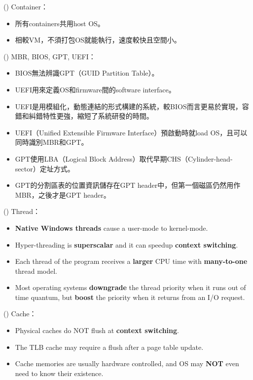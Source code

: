 \begin{theorem}{()} Container： \begin{itemize}
        \item 所有containers共用host OS。
        \item 相較VM，不須打包OS就能執行，速度較快且空間小。
    \end{itemize}
\end{theorem}

\begin{theorem}{()} MBR, BIOS, GPT, UEFI： \begin{itemize}
        \item BIOS無法辨識GPT（GUID Partition Table）。
        \item UEFI用來定義OS和firmware間的software interface。
        \item UEFI是用模組化，動態連結的形式構建的系統，較BIOS而言更易於實現，容錯和糾錯特性更強，縮短了系統研發的時間。
        \item UEFI（Unified Extensible Firmware Interface）預啟動時就load OS，且可以同時識別MBR和GPT。
        \item GPT使用LBA（Logical Block Address）取代早期CHS（Cylinder-head-sector）定址方式。
        \item GPT的分割區表的位置資訊儲存在GPT header中，但第一個磁區仍然用作MBR，之後才是GPT header。
    \end{itemize}
\end{theorem}

\begin{theorem}{()} Thread： \begin{itemize}
        \item \textbf{Native Windows threads} cause a user-mode to kernel-mode.
        \item Hyper-threading is \textbf{superscalar} and it can speedup \textbf{context switching}.
        \item Each thread of the program receives a \textbf{larger} CPU time with \textbf{many-to-one} thread model.
        \item Most operating systems \textbf{downgrade} the thread priority when it runs out of time quantum, but \textbf{boost} the priority when it returns from an I/O request.
    \end{itemize}
\end{theorem}

\begin{theorem}{()} Cache： \begin{itemize}
        \item Physical caches do NOT flush at \textbf{context switching}.
        \item The TLB cache may require a flush after a page table update.
        \item Cache memories are usually hardware controlled, and OS may \textbf{NOT} even need to know their existence.
    \end{itemize}
\end{theorem}


